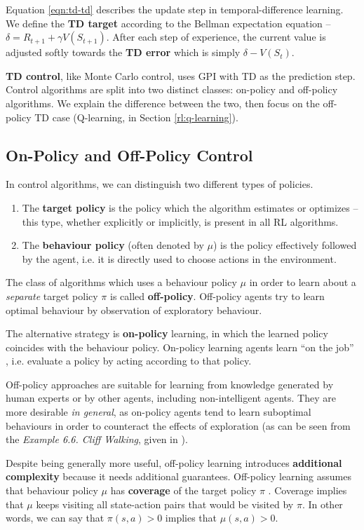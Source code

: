 Equation \ref{eqn:td-td} describes the update step in temporal-difference learning.
We define the \textbf{TD target} according to the Bellman expectation equation -- $\delta = R_{t+1} + \gamma V(S_{t+1})$.
After each step of experience, the current value is adjusted softly towards the \textbf{TD error} which is simply $\delta - V(S_t)$.

\textbf{TD control}, like Monte Carlo control, uses GPI with TD as the prediction step.
Control algorithms are split into two distinct classes: on-policy and off-policy algorithms.
We explain the difference between the two, then focus on the off-policy TD case (Q-learning, in Section \ref{rl:q-learning}).

\subsection{On-Policy and Off-Policy Control}
In control algorithms, we can distinguish two different types of policies.
\begin{enumerate}
    \item The \textbf{target policy} is the policy which the algorithm estimates or optimizes -- this type, whether explicitly or implicitly, is present in all RL algorithms.
    \item The \textbf{behaviour policy} (often denoted by $\mu$) is the policy effectively followed by the agent, i.e. it is directly used to choose actions in the environment.
\end{enumerate}

The class of algorithms which uses a behaviour policy $\mu$ in order to learn about a \emph{separate} target policy $\pi$ is called \textbf{off-policy}.
Off-policy agents try to learn optimal behaviour by observation of exploratory behaviour.

The alternative strategy is \textbf{on-policy} learning, in which the learned policy coincides with the behaviour policy.
On-policy learning agents learn ``on the job'' \cite{silver-lectures}, i.e. evaluate a policy by acting according to that policy.

Off-policy approaches are suitable for learning from knowledge generated by human experts or by other agents, including non-intelligent agents.
They are more desirable \emph{in general}, as on-policy agents tend to learn suboptimal behaviours in order to counteract the effects of exploration (as can be seen from the \emph{Example 6.6. Cliff Walking}, given in \cite{rlai}).

Despite being generally more useful, off-policy learning introduces \textbf{additional complexity} because it needs additional guarantees.
Off-policy learning assumes that behaviour policy $\mu$ has \textbf{coverage} of the target policy $\pi$ \cite{rlai}.
Coverage implies that $\mu$ keeps visiting all state-action pairs that would be visited by $\pi$.
In other words, we can say that $\pi(s, a) > 0$ implies that $\mu(s, a) > 0$.

